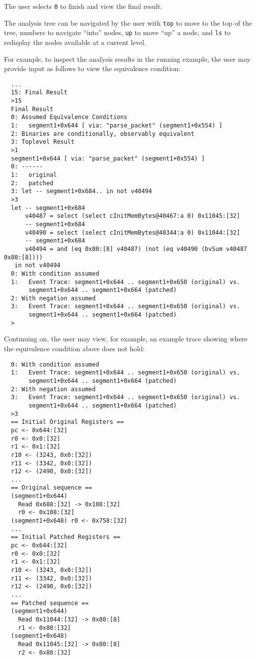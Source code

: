 The user selects \texttt{0} to finish and view the final result.

The \pate{} analysis tree can be navigated by the user with \texttt{top} to move to the top of the tree, numbers to navigate ``into'' nodes, \texttt{up} to move ``up'' a node, and \texttt{ls} to redisplay the nodes available at a current level.

For example, to inspect the analysis results in the running example, the user may provide input as follows to view the equivalence condition:

\begin{verbatim}
  ...
  15: Final Result
  >15
  Final Result
  0: Assumed Equivalence Conditions
  1:   segment1+0x644 [ via: "parse_packet" (segment1+0x554) ]
  2: Binaries are conditionally, observably equivalent
  3: Toplevel Result
  >1
  segment1+0x644 [ via: "parse_packet" (segment1+0x554) ]
  0: ------
  1:   original
  2:   patched
  3: let -- segment1+0x684.. in not v40494
  >3
  let -- segment1+0x684
      v40487 = select (select cInitMemBytes@40467:a 0) 0x11045:[32]
      -- segment1+0x684
      v40490 = select (select cInitMemBytes@40344:a 0) 0x11044:[32]
      -- segment1+0x684
      v40494 = and (eq 0x80:[8] v40487) (not (eq v40490 (bvSum v40487 0x80:[8])))
   in not v40494
  0: With condition assumed
  1:   Event Trace: segment1+0x644 .. segment1+0x650 (original) vs.
       segment1+0x644 .. segment1+0x664 (patched)
  2: With negation assumed
  3:   Event Trace: segment1+0x644 .. segment1+0x650 (original) vs.
       segment1+0x644 .. segment1+0x664 (patched)
  >
\end{verbatim}

Continuing on, the user may view, for example, an example trace showing where the equivalence condition above does not hold:

\begin{verbatim}
  0: With condition assumed
  1:   Event Trace: segment1+0x644 .. segment1+0x650 (original) vs.
       segment1+0x644 .. segment1+0x664 (patched)
  2: With negation assumed
  3:   Event Trace: segment1+0x644 .. segment1+0x650 (original) vs.
       segment1+0x644 .. segment1+0x664 (patched)
  >3
  == Initial Original Registers ==
  pc <- 0x644:[32]
  r0 <- 0x0:[32]
  r1 <- 0x1:[32]
  r10 <- (3243, 0x0:[32])
  r11 <- (3342, 0x0:[32])
  r12 <- (2490, 0x0:[32])
  ...
  == Original sequence ==
  (segment1+0x644)
    Read 0x688:[32] -> 0x108:[32]
    r0 <- 0x108:[32]
  (segment1+0x648) r0 <- 0x758:[32]
  ...
  == Initial Patched Registers ==
  pc <- 0x644:[32]
  r0 <- 0x0:[32]
  r1 <- 0x1:[32]
  r10 <- (3243, 0x0:[32])
  r11 <- (3342, 0x0:[32])
  r12 <- (2490, 0x0:[32])
  ...
  == Patched sequence ==
  (segment1+0x644)
    Read 0x11044:[32] -> 0x80:[8]
    r1 <- 0x80:[32]
  (segment1+0x648)
    Read 0x11045:[32] -> 0x80:[8]
    r2 <- 0x80:[32]
\end{verbatim}

